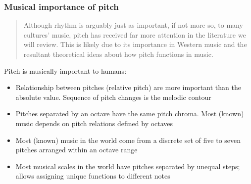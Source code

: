\documentclass{beamer}
\begin{document}
\begin{frame}
	\frametitle{Musical importance of pitch}
	\begin{quote}
	Although rhythm is arguably just as important, if not more so, to many cultures' music, pitch has received far more attention in the literature we will review. This is likely due to its importance in Western music and the resultant theoretical ideas about how pitch functions in music.
	\end{quote}
	Pitch is musically important to humans:
	\begin{itemize}
		\item
			Relationship between pitches (relative pitch) are more important than the absolute value. Sequence of pitch changes is the melodic contour
		\item
			Pitches separated by an octave have the same pitch chroma. Most (known) music depends on pitch relations defined by octaves
		\item
			Most (known) music in the world come from a discrete set of five to seven pitches arranged within an octave range
		\item
			Most musical scales in the world have pitches separated by unequal steps; allows assigning unique functions to different notes
	\end{itemize}
\end{frame}

\end{document}
